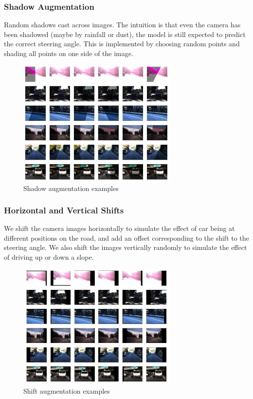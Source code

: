 \documentclass[10pt,twocolumn,letterpaper]{article}
\begin{document}
\subsubsection{Shadow Augmentation}
Random shadows cast across images. The intuition is that even the camera has been shadowed (maybe by rainfall or dust), the model is still expected to predict the correct steering angle. This is implemented by choosing random points and shading all points on one side of the image.

\begin{figure}[!htb]
	\includegraphics[width=8cm]{shadow_aug.JPG}
	\centering
	\caption{Shadow augmentation examples}
	\label{shadow_aug}
\end{figure}


\subsubsection{Horizontal and Vertical Shifts}
We shift the camera images horizontally to simulate the effect of car being at different positions on the road, and add an offset corresponding to the shift to the steering angle. We also shift the images vertically randomly to simulate the effect of driving up or down a slope.

\begin{figure}[!htb]
	\includegraphics[width=8cm]{shift_aug.JPG}
	\centering
	\caption{Shift augmentation examples}
	\label{shift_aug}
\end{figure}
\end{document}

